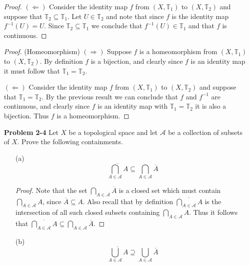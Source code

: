 \documentclass[minion]{homework651}
\begin{document}
\begin{problems}
\begin{proof}
    $(\Leftarrow)$ Consider the identity map $f$ from $(X,\mathbb{T}_1)$ to $(X,\mathbb{T}_2)$ and suppose that $\mathbb{T}_2 \subseteq \mathbb{T}_1$. Let $U \in \mathbb{T}_2$
    and note that since $f$ is the identity map $f^{-1}(U) = U$. Since $\mathbb{T}_2 \subseteq \mathbb{T}_1$ we conclude that $f^{-1}(U) \in \mathbb{T}_1$ and that $f$ is continuous. 
\end{proof}


\begin{proof} (Homeomorphism)
    $(\Rightarrow)$ Suppose $f$ is a homeomorphism from $(X,\mathbb{T}_1)$ to $(X,\mathbb{T}_2)$. By definition $f$ is a bijection, and clearly since $f$ is an identity map it must follow that $\mathbb{T}_1 = \mathbb{T}_2$. 


    $(\Leftarrow)$ Consider the identity map $f$ from $(X,\mathbb{T}_1)$ to $(X,\mathbb{T}_2)$ and suppose that $\mathbb{T}_1 = \mathbb{T}_2$. By the previous result we can conclude that $f$ and $f^{-1}$ are continuous, and clearly 
    since $f$ is an identity map with $\mathbb{T}_1 = \mathbb{T}_2$ it is also a bijection. Thus $f$ is a homeomorphism. 
\end{proof}



\problem \textbf{Problem 2-4} Let $X$ be a topological space and let $\mathcal{A}$ be a collection of subsets of $X$. Prove the following containments. 
\begin{enumerate}
    \item[(a)] \begin{equation*}
        \overline{\bigcap_{A \in \mathcal{A}}A} \subseteq \bigcap_{A \in \mathcal{A}}\overline{A} 
    \end{equation*}
    \begin{proof}
        Note that the set $\bigcap_{A \in \mathcal{A}}\overline{A}$ is a closed set which must contain $\bigcap_{A \in \mathcal{A}}A$, since $\overline{A} \subseteq A$. 
        Also recall that by definition  $\overline{\bigcap_{A \in \mathcal{A}}A}$ is the intersection of all such closed subsets containing $\bigcap_{A \in \mathcal{A}}A$. 
        Thus it follows that  $\overline{\bigcap_{A \in \mathcal{A}}A} \subseteq \bigcap_{A \in \mathcal{A}}\overline{A} $. 
    \end{proof}


    \item[(b)]\begin{equation*}
        \overline{\bigcup_{A \in \mathcal{A}}A} \supseteq \bigcup_{A \in \mathcal{A}}\overline{A} 
    \end{equation*}


\end{enumerate}
\end{problems}
\end{document}
